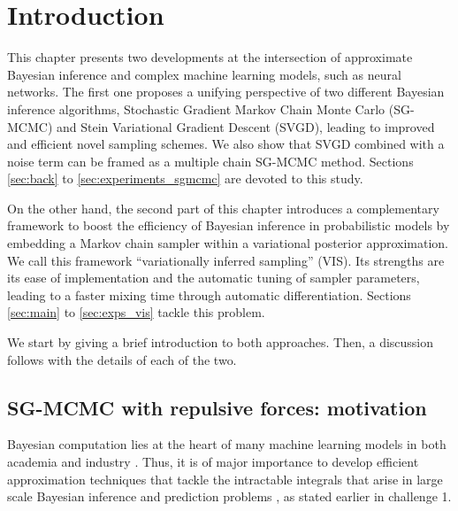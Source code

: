 \section{Introduction}

This chapter presents two developments at the intersection of approximate Bayesian inference and complex machine learning models, such as neural networks. The first one proposes a unifying perspective of two different Bayesian inference algorithms, Stochastic Gradient Markov Chain Monte Carlo (SG-MCMC) and Stein Variational Gradient Descent (SVGD), leading to improved and efficient novel sampling schemes. We also show that SVGD combined with a noise term can be framed as a multiple chain SG-MCMC method. Sections \ref{sec:back} to \ref{sec:experiments_sgmcmc} are devoted to this study.

On the other hand, the second part of this chapter introduces a complementary framework to boost the efficiency of Bayesian inference in probabilistic models  by embedding a Markov chain sampler within a variational posterior approximation. We call this framework “variationally inferred sampling” (VIS). Its strengths are its ease of implementation and the automatic tuning of sampler parameters, leading to a faster mixing time through automatic differentiation.
Sections \ref{sec:main} to \ref{sec:exps_vis} tackle this problem.

We start by giving a brief introduction to both approaches. Then, a discussion follows with the details of each of the two. %




\subsection{SG-MCMC with repulsive forces: motivation }


Bayesian computation lies at the heart of many machine learning models in both academia and industry \parencite{bishop2006pattern}. Thus, it is of major importance to develop efficient approximation techniques that tackle the intractable integrals that arise in large scale Bayesian inference and prediction problems \parencite{gelman2013bayesian}, as stated earlier in challenge 1. 

